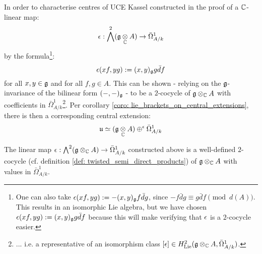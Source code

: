         In order to characterise centres of UCE Kassel constructed in the proof of \cite[Theorem 3.3(iii)]{kassel_universal_central_extensions_of_lie_algebras} a $\mathbb{C}$-linear map:
            $$\e: \bigwedge^2 (\g \tensor_{\bbC} A) \to \bar{\Omega}^1_{A/k}$$
        by the formula\footnote{One can also take $\epsilon(x f, y g) := -(x, y)_{\mathfrak{g}} f \bar{d}g$, since $-f \bar{d}g \equiv g \bar{d}f \pmod{d(A)}$. This results in an isomorphic Lie algebra, but we have chosen $\epsilon(x f, y g) := (x, y)_{\mathfrak{g}} g \bar{d}f$ because this will make verifying that $\epsilon$ is a $2$-cocycle easier.}:
            $$\epsilon(x f, y g) := (x, y)_{\mathfrak{g}} g \bar{d}f$$
        for all $x, y \in \mathfrak{g}$ and for all $f, g \in A$. This can be shown - relying on the $\mathfrak{g}$-invariance of the bilinear form $(-, -)_{\mathfrak{g}}$ - to be a $2$-cocycle of $\g \tensor_{\bbC} A$ with coefficients in $\bar{\Omega}^1_{A/k}$\footnote{... i.e. a representative of an isomorphism class $[\e] \in H^2_{\Lie}(\g \tensor_{\bbC} A, \bar{\Omega}^1_{A/k})$.}. Per corollary \ref{coro: lie_brackets_on_central_extensions}, there is then a corresponding central extension:
            $$\fraku \cong (\g \tensor_{\bbC} A) \oplus^{\e} \bar{\Omega}_{A/k}^1$$
        \begin{lemma} \label{lemma: lie_brackets_on_UCEs_of_current_algebras}
            The linear map $\e: \bigwedge^2 (\g \tensor_{\bbC} A) \to \bar{\Omega}^1_{A/k}$ constructed above is a well-defined $2$-cocycle (cf. definition \ref{def: twisted_semi_direct_products}) of $\g \tensor_{\bbC} A$ with values in $\bar{\Omega}^1_{A/k}$.
        \end{lemma}

